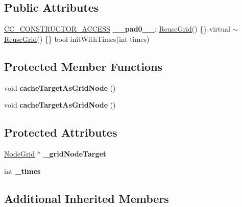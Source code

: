 \subsection*{Public Attributes}
\begin{DoxyCompactItemize}
\item 
\mbox{\label{classReuseGrid_a6c7769f18563ae199225e46a2d42b8d1}} 
\hyperlink{_2cocos2d_2cocos_2base_2ccConfig_8h_a25ef1314f97c35a2ed3d029b0ead6da0}{C\+C\+\_\+\+C\+O\+N\+S\+T\+R\+U\+C\+T\+O\+R\+\_\+\+A\+C\+C\+E\+SS} {\bfseries \+\_\+\+\_\+pad0\+\_\+\+\_\+}\+: \hyperlink{classReuseGrid}{Reuse\+Grid}() \{\} virtual $\sim$\hyperlink{classReuseGrid}{Reuse\+Grid}() \{\} bool init\+With\+Times(int times)
\end{DoxyCompactItemize}
\subsection*{Protected Member Functions}
\begin{DoxyCompactItemize}
\item 
\mbox{\label{classReuseGrid_aa14c2109c8b8b1f3011d994b1f7918a5}} 
void {\bfseries cache\+Target\+As\+Grid\+Node} ()
\item 
\mbox{\label{classReuseGrid_aa14c2109c8b8b1f3011d994b1f7918a5}} 
void {\bfseries cache\+Target\+As\+Grid\+Node} ()
\end{DoxyCompactItemize}
\subsection*{Protected Attributes}
\begin{DoxyCompactItemize}
\item 
\mbox{\label{classReuseGrid_ac4eef756d8d3beab11cf0dd93d57e7de}} 
\hyperlink{classNodeGrid}{Node\+Grid} $\ast$ {\bfseries \+\_\+grid\+Node\+Target}
\item 
\mbox{\label{classReuseGrid_a6ba891f97efb58b6ed79f33daec9f452}} 
int {\bfseries \+\_\+times}
\end{DoxyCompactItemize}
\subsection*{Additional Inherited Members}


